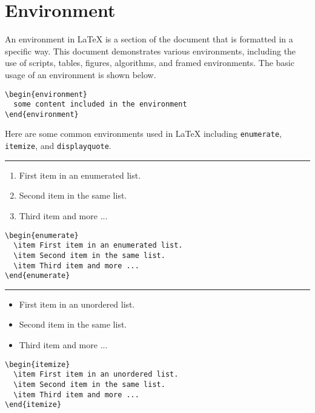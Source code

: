 \section{Environment}

An environment in {\LaTeX} is a section of the document that is formatted in a specific way. 
This document demonstrates various environments, including the use of scripts, tables, figures, algorithms, and framed environments.
The basic usage of an environment is shown below.

\begin{verbatim}
\begin{environment}
  some content included in the environment
\end{environment}
\end{verbatim}

Here are some common environments used in {\LaTeX} including \texttt{enumerate}, \texttt{itemize}, and \texttt{displayquote}.

\noindent\rule{\linewidth}{0.4pt}

\begin{multicols}{2}
  \begin{enumerate}
    \item First item in an enumerated list.
    \item Second item in the same list.
    \item Third item and more ...
  \end{enumerate}
  \begin{verbatim}
\begin{enumerate}
  \item First item in an enumerated list.
  \item Second item in the same list.
  \item Third item and more ...
\end{enumerate}
  \end{verbatim}
\end{multicols}

\noindent\rule{\linewidth}{0.4pt}

\begin{multicols}{2}
  \begin{itemize}
    \item First item in an unordered list.
    \item Second item in the same list.
    \item Third item and more ...
  \end{itemize}
  \begin{verbatim}
\begin{itemize}
  \item First item in an unordered list.
  \item Second item in the same list.
  \item Third item and more ...
\end{itemize}
  \end{verbatim}
\end{multicols}

